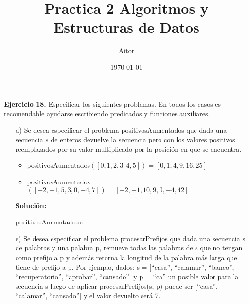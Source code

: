 \documentclass{article}
\title{Practica 2 Algoritmos y Estructuras de Datos}
\author{Aitor}
\date{\today}
\begin{document}
\maketitle
\textbf{Ejercicio 18.} Especificar los siguientes problemas. En todos los casos es recomendable ayudarse escribiendo predicados y funciones auxiliares.
\begin{itemize}
    \item[d)]  Se desea especificar el problema positivosAumentados que dada una secuencia $s$ de enteros devuelve la secuencia pero con los valores positivos reemplazados por su valor multiplicado por la posici\'on en que se encuentra.
    \begin{itemize}
        \item positivosAumentados$([0, 1, 2, 3, 4, 5]) = [0, 1, 4, 9, 16, 25]$

        \item positivosAumentados$([-2, -1, 5, 3, 0, -4, 7]) = [-2, -1, 10, 9, 0, -4, 42]$
    \end{itemize}

    \textbf{Soluci\'on:}
    \begin{proc}{positivosAumentados}{\Inout s: \TLista{\ent} }{}

    \end{proc}


    \item[e)] Se desea especificar el problema procesarPrefijos que dada una secuencia s de palabras y una palabra p, remueve todas
    las palabras de s que no tengan como prefijo a p y adem\'as retorna la longitud de la palabra m\'as larga que tiene de prefijo a
    p. Por ejemplo, dados: s = [``casa'', ``calamar'', ``banco'', ``recuperatorio'', ``aprobar'', ``cansado''] y p = ``ca'' un
    posible valor para la secuencia s luego de aplicar procesarPrefijos(s, p) puede ser [``casa'', ``calamar'', ``cansado''] y el valor devuelto ser\'a 7.
\end{itemize}
\end{document}
